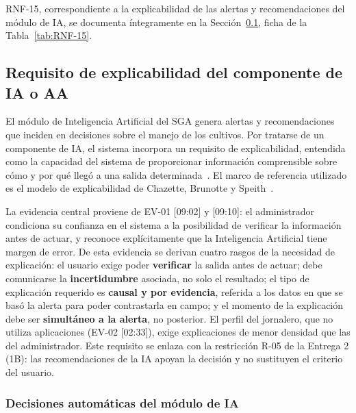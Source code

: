 \documentclass[12pt,a4paper]{article}
\begin{document}
\bigskip
\noindent RNF-15, correspondiente a la explicabilidad de las alertas y recomendaciones del módulo de IA, se documenta íntegramente en la Sección~\ref{sec:explicabilidad-ia}, ficha de la Tabla~\ref{tab:RNF-15}.

\subsection{Requisito de explicabilidad del componente de IA o AA}
\label{sec:explicabilidad-ia}

El módulo de Inteligencia Artificial del SGA genera alertas y recomendaciones que inciden en decisiones sobre el manejo de los cultivos. Por tratarse de un componente de IA, el sistema incorpora un requisito de explicabilidad, entendida como la capacidad del sistema de proporcionar información comprensible sobre cómo y por qué llegó a una salida determinada~\cite{chazette2020}. El marco de referencia utilizado es el modelo de explicabilidad de Chazette, Brunotte y Speith~\cite{chazette2021,chazette2022}.

La evidencia central proviene de EV-01 [09:02] y [09:10]: el administrador condiciona su confianza en el sistema a la posibilidad de verificar la información antes de actuar, y reconoce explícitamente que la Inteligencia Artificial tiene margen de error. De esta evidencia se derivan cuatro rasgos de la necesidad de explicación: el usuario exige poder \textbf{verificar} la salida antes de actuar; debe comunicarse la \textbf{incertidumbre} asociada, no solo el resultado; el tipo de explicación requerido es \textbf{causal y por evidencia}, referida a los datos en que se basó la alerta para poder contrastarla en campo; y el momento de la explicación debe ser \textbf{simultáneo a la alerta}, no posterior. El perfil del jornalero, que no utiliza aplicaciones (EV-02 [02:33]), exige explicaciones de menor densidad que las del administrador. Este requisito se enlaza con la restricción R-05 de la Entrega 2 (1B): las recomendaciones de la IA apoyan la decisión y no sustituyen el criterio del usuario.

\subsubsection{Decisiones automáticas del módulo de IA}
\label{sec:decisiones-ia}
\end{document}
